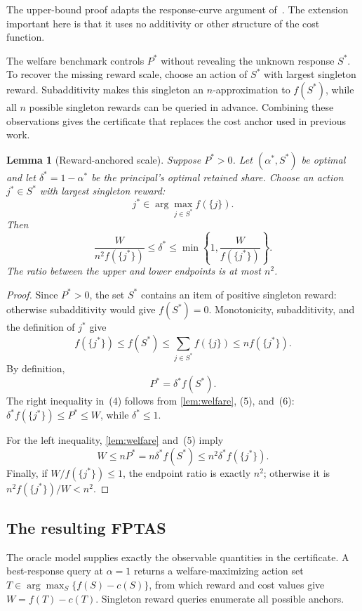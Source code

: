 \documentclass[11pt]{article}
\newtheorem{lemma}[lemma]{Lemma}
\begin{document}
The upper-bound proof adapts the response-curve argument
of~\cite{DEFK25}.  The extension important here is that it uses no
additivity or other structure of the cost function.

The welfare benchmark controls $P^*$ without revealing the unknown response
$S^*$.  To recover the missing reward scale, choose an action of $S^*$ with
largest singleton reward.  Subadditivity makes this singleton an
$n$-approximation to $f(S^*)$, while all $n$ possible singleton rewards can
be queried in advance.  Combining these observations gives the certificate
that replaces the cost anchor used in previous work.

\begin{lemma}[Reward-anchored scale]\label{lem:bracket}
Suppose $P^*>0$.  Let $(\alpha^*,S^*)$ be optimal and let
$\delta^*=1-\alpha^*$ be the principal's optimal retained share.  Choose an
action $j^*\in S^*$ with largest singleton reward:
\[
         j^*\in\arg\max_{j\in S^*}f(\{j\}).
\]
Then
\[
\frac{W}{n^2f(\{j^*\})}
\leq\delta^*
\leq
\min\!\left\{1,\frac{W}{f(\{j^*\})}\right\}.              \tag{4}
\]
The ratio between the upper and lower endpoints is at most $n^2$.
\end{lemma}

\begin{proof}
Since $P^*>0$, the set $S^*$ contains an item of positive singleton reward:
otherwise subadditivity would give $f(S^*)=0$.  Monotonicity,
subadditivity, and the definition of $j^*$ give
\[
 f(\{j^*\})\leq f(S^*)\leq
 \sum_{j\in S^*}f(\{j\})\leq nf(\{j^*\}).                 \tag{5}
\]
By definition,
\[
                         P^*=\delta^*f(S^*).              \tag{6}
\]
The right inequality in~(4) follows from \cref{lem:welfare}, (5), and~(6):
$\delta^*f(\{j^*\})\leq P^*\leq W$, while $\delta^*\leq1$.

For the left inequality, \cref{lem:welfare} and~(5) imply
\[
        W\leq nP^*
          =n\delta^*f(S^*)
          \leq n^2\delta^*f(\{j^*\}).
\]
Finally, if $W/f(\{j^*\})\leq1$, the endpoint ratio is exactly $n^2$;
otherwise it is $n^2f(\{j^*\})/W<n^2$.
\end{proof}

\subsection{The resulting FPTAS}

The oracle model supplies exactly the observable quantities in the
certificate.  A best-response query at $\alpha=1$ returns a
welfare-maximizing action set
$T\in\arg\max_S\{f(S)-c(S)\}$, from which reward and cost values give
$W=f(T)-c(T)$.  Singleton reward queries enumerate all possible anchors.
\end{document}

